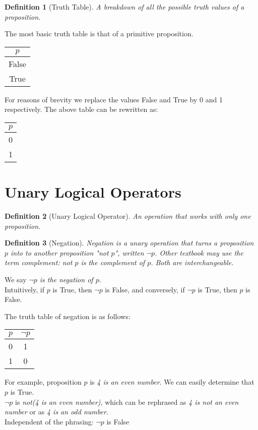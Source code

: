 \documentclass[10pt,a4paper,draft,titlepage,onecolumn]{book}
\newtheorem{definition}{Definition}[subsection]
\begin{document}
\begin{definition}[Truth Table]
A breakdown of all the possible truth values of a proposition. 
\end{definition}
The most basic truth table is that of a primitive proposition.
\begin{center}
\begin{tabular}{ |c| }
 \hline
 $p$ \\
 \hline
 False \\ 
 True  \\
 \hline
\end{tabular}
\end{center}
For reasons of brevity we replace the values False and True by 0 and 1 respectively. The above table can be rewritten as: 
\begin{center}
\begin{tabular}{ |c| }
 \hline
 $p$ \\
 \hline
 0 \\ 
 1 \\
 \hline
\end{tabular}
\end{center}


\section{Unary Logical Operators}
\begin{definition}[Unary Logical Operator]
An operation that works with only one proposition.
\end{definition}

\begin{definition}[Negation] Negation is a unary operation that turns a proposition $p$ into to another proposition "not $p$", written {$\neg$}$p$. Other textbook may use the term complement: not $p$ is the complement of $p$. Both are interchangeable. 
\end{definition} 
We say  \textit{{$\neg$}$p$ is the negation of $p$}. \\
Intuitively, if $p$ is True, then $\neg${$p$} is False, and conversely, if $\neg${$p$} is True, then $p$ is False.

The truth table of negation is as follows:
\begin{center}
\begin{tabular}{ |c| c| }
 \hline
 $p$ & {$\neg$}$p$ \\
 \hline
 0 & 1 \\ 
 1 & 0 \\
 \hline
\end{tabular}
\end{center}
For example, proposition $p$ is \textit{4 is an even number}. We can easily determine that $p$ is True.\\
$\neg${$p$} is  \textit{not(4 is an even number)}, which can be rephrased as \textit{4 is not an even number} or as \textit{4 is an odd number}.\\
Independent of the phrasing: $\neg${$p$} is False 
\end{document}
